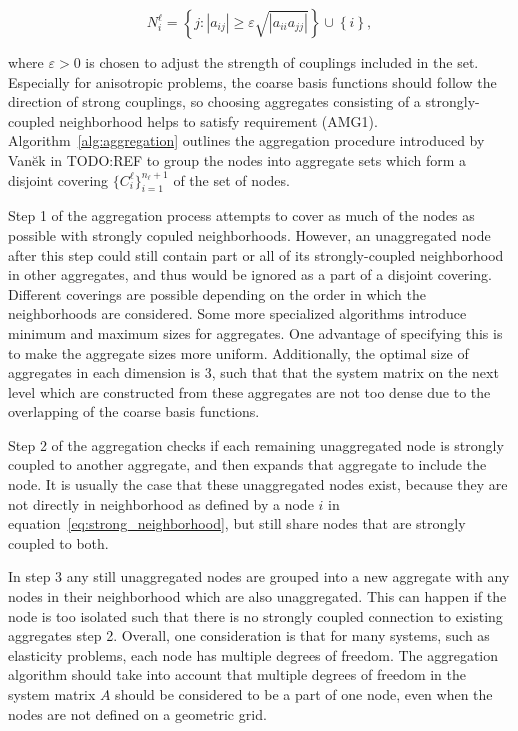 \begin{equation}
	\label{eq:strong_neighborhood}
	N_i^\ell = \left\{ j : |a_{ij}| \geq \varepsilon \sqrt{|a_{ii} a_{jj} |} \right\} \cup \left\{ i \right\},
\end{equation}

where $\varepsilon > 0$ is chosen to adjust the strength of couplings included in the set. Especially for anisotropic problems, the coarse basis functions should follow the direction of strong couplings, so choosing aggregates consisting of a strongly-coupled neighborhood helps to satisfy requirement (AMG1). Algorithm~\ref{alg:aggregation} outlines the aggregation procedure introduced by Van\u{e}k in TODO:REF to group the nodes into aggregate sets which form a disjoint covering $\{C_i^\ell\}_{i=1}^{n_\ell + 1}$ of the set of nodes.

Step 1 of the aggregation process attempts to cover as much of the nodes as possible with strongly copuled neighborhoods. However, an unaggregated node after this step could still contain part or all of its strongly-coupled neighborhood in other aggregates, and thus would be ignored as a part of a disjoint covering. Different coverings are possible depending on the order in which the neighborhoods are considered. Some more specialized algorithms introduce minimum and maximum sizes for aggregates. One advantage of specifying this is to make the aggregate sizes more uniform. Additionally, the optimal size of aggregates in each dimension is 3, such that that the system matrix on the next level which are constructed from these aggregates are not too dense due to the overlapping of the coarse basis functions.

Step 2 of the aggregation checks if each remaining unaggregated node is strongly coupled to another aggregate, and then expands that aggregate to include the node. It is usually the case that these unaggregated nodes exist, because they are not directly in neighborhood as defined by a node $i$ in equation~\ref{eq:strong_neighborhood}, but still share nodes that are strongly coupled to both.

In step 3 any still unaggregated nodes are grouped into a new aggregate with any nodes in their neighborhood which are also unaggregated. This can happen if the node is too isolated such that there is no strongly coupled connection to existing aggregates step 2. Overall, one consideration is that for many systems, such as elasticity problems, each node has multiple degrees of freedom. The aggregation algorithm should take into account that multiple degrees of freedom in the system matrix $A$ should be considered to be a part of one node, even when the nodes are not defined on a geometric grid.


